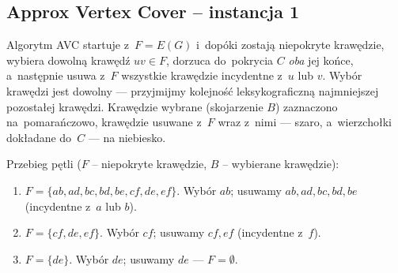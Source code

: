 \subsection{Approx Vertex Cover -- instancja 1}

Algorytm \textsc{AVC} startuje z~$F = E(G)$ i~dopóki zostają niepokryte
krawędzie, wybiera dowolną krawędź $uv \in F$, dorzuca do~pokrycia $C$
\emph{oba} jej końce, a~następnie usuwa z~$F$ wszystkie krawędzie incydentne
z~$u$ lub $v$. Wybór krawędzi jest dowolny --- przyjmijmy kolejność
leksykograficzną najmniejszej pozostałej krawędzi. Krawędzie wybrane
(skojarzenie $B$) zaznaczono na~\textcolor{accentB}{pomarańczowo}, krawędzie
usuwane z~$F$ wraz z~nimi --- szaro, a~wierzchołki dokładane do~$C$ --- na
niebiesko.

\newcommand{\vcnodes}[6]{%
	\node[vcnode,#1] (a) at (0,2) {$a$};
	\node[vcnode,#2] (b) at (2,2) {$b$};
	\node[vcnode,#3] (c) at (4,2) {$c$};
	\node[vcnode,#4] (d) at (0,0) {$d$};
	\node[vcnode,#5] (e) at (2,0) {$e$};
	\node[vcnode,#6] (f) at (4,0) {$f$};
}
\newcommand{\vcedges}[8]{%
	\draw[#1] (a)--(b); \draw[#2] (b)--(c); \draw[#3] (a)--(d);
	\draw[#4] (b)--(e); \draw[#5] (c)--(f); \draw[#6] (d)--(e);
	\draw[#7] (e)--(f); \draw[#8] (b)--(d);
}
\newcommand{\vcpanel}[1]{%
	\begin{tikzpicture}[scale=0.6, baseline=(current bounding box.center)]#1\end{tikzpicture}}
\newcommand{\vclabel}[1]{\node[font=\footnotesize] at (2,-0.9) {#1};}

\begin{dygresja}
	Przebieg pętli ($F$ -- niepokryte krawędzie, $B$ -- wybierane krawędzie):
	\begin{enumerate}[nosep]
		\item $F = \{ab, ad, bc, bd, be, cf, de, ef\}$. Wybór $ab$; usuwamy
		      $ab, ad, bc, bd, be$ (incydentne z~$a$ lub $b$).
		\item $F = \{cf, de, ef\}$. Wybór $cf$; usuwamy $cf, ef$ (incydentne z~$f$).
		\item $F = \{de\}$. Wybór $de$; usuwamy $de$ --- $F = \emptyset$.
	\end{enumerate}
\end{dygresja}

